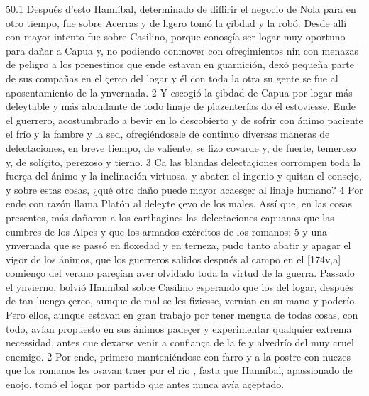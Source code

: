 \documentclass[11pt,twoside]{article}\makeatletter
\def\persName{}\def\name{}
\begin{document}
50.1 Después d’esto  {\persName Hanníbal}, determinado de diffirir el negocio de Nola para en otro tiempo, fue sobre Acerras y de ligero tomó la çibdad y la robó. Desde allí con mayor intento fue sobre Casilino, porque conosçía ser logar muy oportuno para dañar a Capua y, no podiendo conmover con ofreçimientos nin con menazas de peligro a los prenestinos que ende estavan en guarnición, dexó pequeña parte de sus compañas en el çerco del logar y él con toda la otra su gente se fue al aposentamiento de la ynvernada. 2 Y escogió la çibdad de Capua por logar más deleytable y más abondante de todo linaje de plazenterías do él estoviesse. Ende el guerrero, acostumbrado a bevir en lo descobierto y de sofrir con ánimo paciente el frío y la fambre y la sed, ofreçiéndosele de continuo diversas maneras de delectaciones, en breve tiempo, de valiente, se fizo covarde y, de fuerte, temeroso y, de solíçito, perezoso y tierno. 3 Ca las blandas delectaçiones corrompen toda la fuerça del ánimo y la inclinación virtuosa, y abaten el ingenio y quitan el consejo, y sobre estas cosas, ¿qué otro daño puede mayor acaesçer al linaje humano? 4 Por ende con razón llama Platón al deleyte çevo de los males. Assí que, en las cosas presentes, más dañaron a los carthagines las delectaciones capuanas que las cumbres de los Alpes y que los armados exércitos de los romanos; 5 y una ynvernada que se passó en floxedad y en terneza, pudo tanto abatir y apagar el vigor de los ánimos, que los guerreros salidos después al campo en el %
[174v,a] comienço del verano pareçían aver olvidado toda la virtud de la guerra.
\pend
{} Passado el ynvierno, bolvió  {\persName Hanníbal} sobre Casilino esperando que los del logar, después de tan luengo çerco, aunque de mal se les fiziesse, vernían en su mano y poderío. Pero ellos, aunque estavan en gran trabajo por tener mengua de todas cosas, con todo, avían propuesto en sus ánimos padeçer y experimentar qualquier extrema necessidad, antes que dexarse venir a confiança de la fe y alvedrío del muy cruel enemigo. 2 Por ende, primero manteniéndose con farro y a la postre con nuezes que los romanos les osavan traer por el río , fasta que  {\persName Hanníbal}, apassionado de enojo, tomó el logar por partido que antes nunca avía açeptado.
\pend
\pstart
\end{document}
